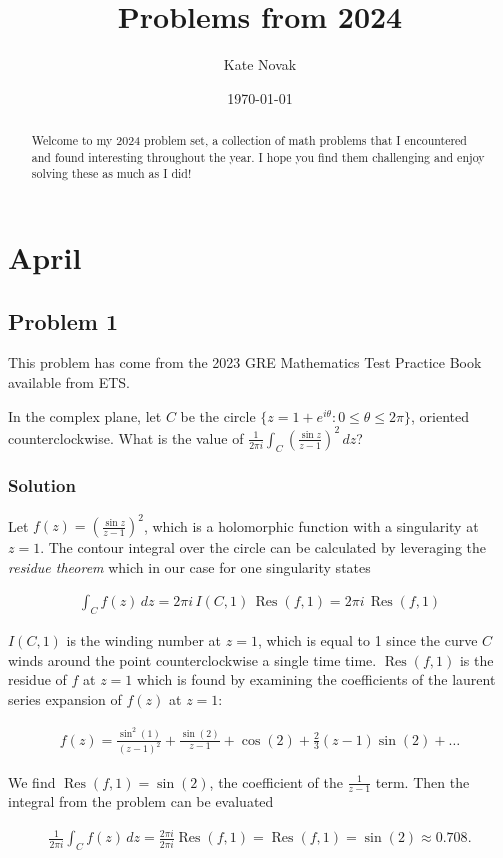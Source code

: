 \documentclass[12pt]{article}
\title{Problems from 2024}
\author{Kate Novak}
\date{\today}
\begin{document}
\maketitle

\begin{abstract}
Welcome to my 2024 problem set, a collection of math problems that I encountered and found interesting throughout the year.
I hope you find them challenging and enjoy solving these as much as I did!
\end{abstract}

\setcounter{section}{3}
\section{April}

\subsection{Problem 1}

This problem has come from the 2023 GRE Mathematics Test Practice Book available from ETS.

In the complex plane, let $C$ be the circle $\{ z = 1 + e^{i\theta} : 0 \le \theta \le 2\pi\}$, oriented counterclockwise. What is the value of $\frac{1}{2 \pi i} \int_{C} \left( \frac{\sin z}{z - 1} \right)^2\,dz$?

\subsubsection*{Solution}

Let $f(z) = \left( \frac{\sin z}{z - 1} \right)^2$, which is a holomorphic function with a singularity at $z=1$. The contour integral over the circle can be calculated by leveraging the {\em{residue theorem}} which in our case for one singularity states

\begin{align}
  \int_{C} f(z)\, dz = 2 \pi i \, I(C,1) \, \operatorname{Res}(f,1) = 2 \pi i \, \operatorname{Res}(f,1)
\end{align}

$I(C,1)$ is the winding number at $z=1$, which is equal to 1 since the curve $C$ winds around the point counterclockwise a single time time.
$\operatorname{Res}(f,1)$ is the residue of $f$ at $z=1$ which is found by examining the coefficients of the laurent series expansion of $f(z)$ at $z = 1$:

\begin{align}
  f(z) =
  \frac{\sin^2(1)}{(z-1)^2} + \frac{\sin(2)}{z-1} + \cos(2) + \frac{2}{3}(z-1)\sin(2) + \dots
\end{align}

We find $\operatorname{Res}(f,1) = \sin(2)$, the coefficient of the $\frac{1}{z-1}$ term.
Then the integral from the problem can be evaluated

\begin{align}
  \frac{1}{2 \pi i} \int_{C} f(z)\,dz
    = \frac{2 \pi i}{2 \pi i} \operatorname{Res}(f,1)
    = \operatorname{Res}(f,1)
    = \sin(2)
    \approx 0.708.
\end{align}
\end{document}
